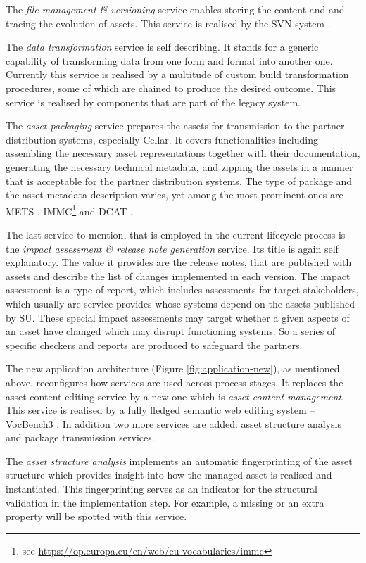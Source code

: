 	The \textit{file management \& versioning} service enables storing the content and and tracing the evolution of assets. This service is realised by the SVN system \cite{svn}.
	
	The \textit{data transformation} service is self describing. It stands for a generic capability of transforming data from one form and format into another one. Currently this service is realised by a multitude of custom build transformation procedures, some of which are chained to produce the desired outcome. This service is realised by components that are part of the legacy system. 
	
	The \textit{asset packaging} service prepares the assets for transmission to the partner distribution systems, especially Cellar. It covers functionalities including assembling the necessary asset representations together with their documentation, generating the necessary technical metadata, and zipping the assets in a manner that is acceptable for the partner distribution systems. The type of package and the asset metadata description varies, yet among the most prominent ones are METS \citep{mets}, IMMC\footnote{see \url{https://op.europa.eu/en/web/eu-vocabularies/immc}} and DCAT \cite{dcat2}. 
	
	The last service to mention, that is employed in the current lifecycle process is the \textit{impact assessment \& release note generation} service. Its title is again self explanatory. The value it provides are the release notes, that are published with assets and describe the list of changes implemented in each version. The impact assessment is a type of report, which includes assessments for target stakeholders, which usually are service provides whose systems depend on the assets published by SU. These special impact assessments may target whether a given aspects of an asset have changed which may disrupt functioning systems. So a series of specific checkers and reports are produced to safeguard the partners. 
	
	The new application architecture (Figure \ref{fig:application-new}), as mentioned above, reconfigures how services are used across process stages. It replaces the asset content editing service by a new one which is \textit{asset content management}. This service is realised by a fully fledged semantic web editing system -- VocBench3 \citep{stellatovocbench}. In addition two more services are added: asset structure analysis and package transmission services.
	
	The \textit{asset structure analysis} implements an automatic fingerprinting of the asset structure which provides insight into how the managed asset is realised and instantiated. This fingerprinting serves as an indicator for the structural validation in the implementation step. For example, a missing or an extra property will be spotted with this service. 
	
